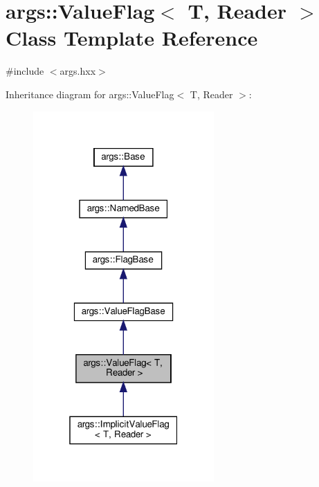 \hypertarget{classargs_1_1_value_flag}{}\section{args\+:\+:Value\+Flag$<$ T, Reader $>$ Class Template Reference}
\label{classargs_1_1_value_flag}


{\ttfamily \#include $<$args.\+hxx$>$}



Inheritance diagram for args\+:\+:Value\+Flag$<$ T, Reader $>$\+:\nopagebreak
\begin{figure}[H]
\begin{center}
\leavevmode
\includegraphics[width=196pt]{classargs_1_1_value_flag__inherit__graph}
\end{center}
\end{figure}


